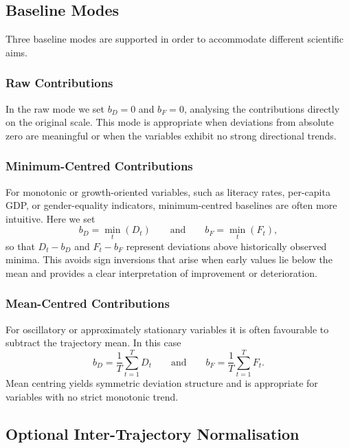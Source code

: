     \subsection{Baseline Modes}

        Three baseline modes are supported in order to accommodate different scientific aims.

        \subsubsection{Raw Contributions}
            In the raw mode we set $b_D = 0$ and $b_F = 0$, analysing the contributions directly on the original scale. This mode is appropriate when deviations from absolute zero are meaningful or when the variables exhibit no strong directional trends.

        \subsubsection{Minimum-Centred Contributions}
            For monotonic or growth-oriented variables, such as literacy rates, per-capita GDP, or gender-equality indicators, minimum-centred baselines are often more intuitive. Here we set
            \[
                b_D = \min_{t}(D_t) \qquad \text{and} \qquad b_F = \min_{t}(F_t),
            \]
            so that $D_t - b_D$ and $F_t - b_F$ represent deviations above historically observed minima. This avoids sign inversions that arise when early values lie below the mean and provides a clear interpretation of improvement or deterioration.

        \subsubsection{Mean-Centred Contributions}
            For oscillatory or approximately stationary variables it is often favourable to subtract the trajectory mean. In this case
            \[
                b_D = \frac{1}{T}\sum_{t=1}^{T} D_t \qquad \text{and} \qquad
                b_F = \frac{1}{T}\sum_{t=1}^{T} F_t.
            \]
            Mean centring yields symmetric deviation structure and is appropriate for variables with no strict monotonic trend.

    \subsection{Optional Inter-Trajectory Normalisation}

